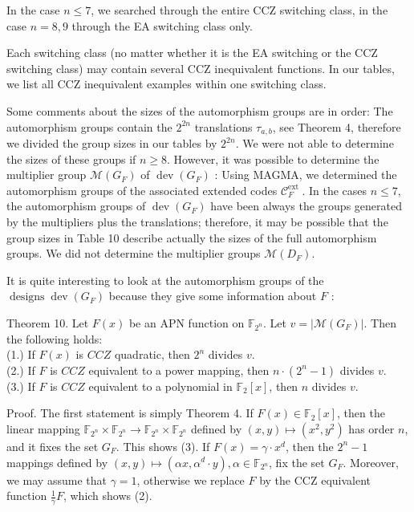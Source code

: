 \documentclass[10pt]{article}
\begin{document}
In the case $n \leq 7$, we searched through the entire CCZ switching class, in the case $n=8,9$ through the EA switching class only.

Each switching class (no matter whether it is the EA switching or the CCZ switching class) may contain several CCZ inequivalent functions. In our tables, we list all CCZ inequivalent examples within one switching class.

Some comments about the sizes of the automorphism groups are in order: The automorphism groups contain the $2^{2 n}$ translations $\tau_{a, b}$, see Theorem 4, therefore we divided the group sizes in our tables by $2^{2 n}$. We were not able to determine the sizes of these groups if $n \geq 8$. However, it was possible to determine the multiplier group $\mathcal{M}\left(G_{F}\right)$ of $\operatorname{dev}\left(G_{F}\right)$ : Using MAGMA, we determined the automorphism groups of the associated extended codes $\mathcal{C}_{F}^{\text {ext }}$. In the cases $n \leq 7$, the automorphism groups of $\operatorname{dev}\left(G_{F}\right)$ have been always the groups generated by the multipliers plus the translations; therefore, it may be possible that the group sizes in Table 10 describe actually the sizes of the full automorphism groups. We did not determine the multiplier groups $\mathcal{M}\left(D_{F}\right)$.

It is quite interesting to look at the automorphism groups of the $\operatorname{designs} \operatorname{dev}\left(G_{F}\right)$ because they give some information about $F$ :

Theorem 10. Let $F(x)$ be an APN function on $\mathbb{F}_{2^{n}}$. Let $v=\left|\mathcal{M}\left(G_{F}\right)\right|$. Then the following holds:\\
(1.) If $F(x)$ is $C C Z$ quadratic, then $2^{n}$ divides $v$.\\
(2.) If $F$ is $C C Z$ equivalent to a power mapping, then $n \cdot\left(2^{n}-1\right)$ divides $v$.\\
(3.) If $F$ is $C C Z$ equivalent to a polynomial in $\mathbb{F}_{2}[x]$, then $n$ divides $v$.

Proof. The first statement is simply Theorem 4. If $F(x) \in \mathbb{F}_{2}[x]$, then the linear mapping $\mathbb{F}_{2^{n}} \times \mathbb{F}_{2^{n}} \rightarrow \mathbb{F}_{2^{n}} \times \mathbb{F}_{2^{n}}$ defined by $(x, y) \mapsto\left(x^{2}, y^{2}\right)$ has order $n$, and it fixes the set $G_{F}$. This shows (3). If $F(x)=\gamma \cdot x^{d}$, then the $2^{n}-1$ mappings defined by $(x, y) \mapsto\left(\alpha x, \alpha^{d} \cdot y\right), \alpha \in \mathbb{F}_{2^{n}}$, fix the set $G_{F}$. Moreover, we may assume that $\gamma=1$, otherwise we replace $F$ by the CCZ equivalent function $\frac{1}{\gamma} F$, which shows (2).
\end{document}
